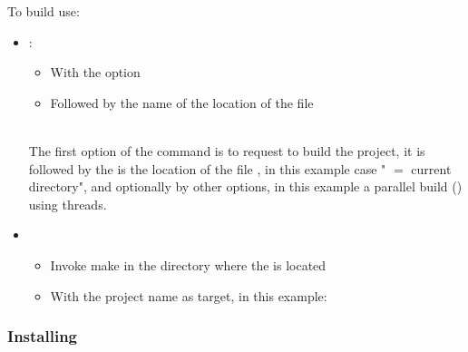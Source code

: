 To build use: 
\begin{itemize}
\item {}:
\begin{itemize}
\item With the  option
\item Followed by the name of the location of the file 
\end{itemize}
\vspace{-1cm}
\begin{scripti}
     
\end{scripti} 
\\[-0.75cm]
\noindent The first option of the command is to request to build the project, it is followed by the is the location of the file , in this example case " $=$ current directory", and optionally by other options, in this example a parallel build () using  threads. 
\item {}
\begin{itemize}
\item Invoke make in the directory where the  is located
\item With the project name as target, in this example: 
\end{itemize}
\vspace{-0.75cm}
\begin{scripti}
    
\end{scripti} 
\end{itemize}
\vspace{-1cm}
\subsubsection*{Installing}

